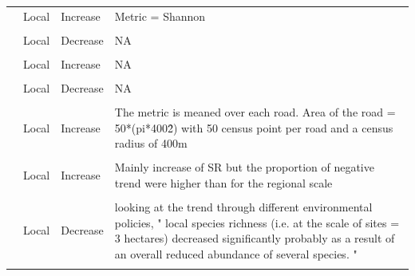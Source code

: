 \documentclass[
  12pt,
  oneside]{report}
\begin{document}
\begin{landscape}
\begin{longtable}[t]{>{\raggedright\arraybackslash}p{6.5em}>{\raggedright\arraybackslash}p{6.5em}>{\raggedright\arraybackslash}p{6.5em}>{\raggedright\arraybackslash}p{40em}}
 & Local & Increase & Metric = Shannon\\
\cellcolor{gray!6}{} & \cellcolor{gray!6}{Local} & \cellcolor{gray!6}{Increase} & \cellcolor{gray!6}{Metric = Simpson}\\
 & Local & Decrease & NA\\
\cellcolor{gray!6}{} & \cellcolor{gray!6}{Local} & \cellcolor{gray!6}{Increase} & \cellcolor{gray!6}{\vphantom{2} NA}\\
\addlinespace
 & Local & Increase & \vphantom{1} NA\\
\cellcolor{gray!6}{} & \cellcolor{gray!6}{Local} & \cellcolor{gray!6}{Increase} & \cellcolor{gray!6}{NA}\\
\cite{sorte_changes_2005} & Local & Decrease & NA\\
\cellcolor{gray!6}{} & \cellcolor{gray!6}{Local} & \cellcolor{gray!6}{Decrease} & \cellcolor{gray!6}{Metric = evenness}\\
 & Local & Increase & The metric is meaned over each road. Area of the road = 50*(pi*400\^2) with 50 census point per road and a census radius of 400m\\
\addlinespace
\cellcolor{gray!6}{\cite{van_turnhout_scale-dependent_2007}} & \cellcolor{gray!6}{Regional} & \cellcolor{gray!6}{Increase} & \cellcolor{gray!6}{For each region, the trend is computed}\\
 & Local & Increase & Mainly increase of SR but the proportion of negative trend were higher than for the regional scale\\
\cellcolor{gray!6}{} & \cellcolor{gray!6}{National} & \cellcolor{gray!6}{Increase} & \cellcolor{gray!6}{National scale}\\
\cite{wretenberg_changes_2010} & Local & Decrease & looking at the trend through different environmental policies, " local species richness (i.e. at the scale of sites = 3 hectares) decreased significantly probably as a result of an overall reduced abundance of several species. "\\*
\end{longtable}
\endgroup{}
\end{landscape}

\singlespacing 


%
\end{document}
